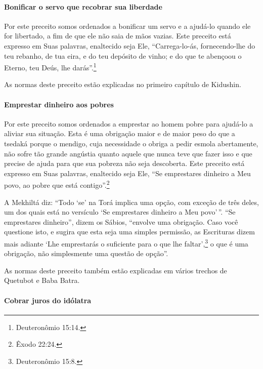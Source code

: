 \paragraph{Bonificar o servo que recobrar sua liberdade}

Por este preceito somos ordenados a bonificar um servo e a ajudá-lo
quando ele for libertado, a fim de que ele não saia de mãos vazias. Este
preceito está expresso em Suas palavras, enaltecido seja Ele,
``Carrega-lo-ás, fornecendo-lhe do teu rebanho, de tua eira, e do teu
depósito de vinho; e do que te abençoou o Eterno, teu Deús, lhe darás''.\footnote{Deuteronômio 15:14.}

As normas deste preceito estão explicadas no primeiro capítulo de Kidushin.

\paragraph{Emprestar dinheiro aos pobres}

Por este preceito somos ordenados a emprestar ao homem pobre para
ajudá-lo a aliviar sua situação. Esta é uma obrigação maior e de maior
peso do que a tsedaká porque o mendigo, cuja necessidade o obriga a
pedir esmola abertamente, não sofre tão grande angústia quanto aquele
que nunca teve que fazer isso e que precise de ajuda para que sua
pobreza não seja descoberta. Este preceito está expresso em Suas
palavras, enaltecido seja Ele, ``Se emprestares dinheiro a Meu povo, ao
pobre que está contigo''.\footnote{Êxodo 22:24.}

A Mekhiltá diz: ``Todo `se' na Torá implica uma opção, com exceção de
três deles, um dos quais está no versículo `Se emprestares dinheiro a
Meu povo'\,''. ``Se emprestares dinheiro'', dizem os Sábios, ``envolve uma
obrigação. Caso você questione isto, e sugira que esta seja uma simples
permissão, as Escrituras dizem mais adiante `Lhe emprestarás o
suficiente para o que lhe faltar',\footnote{Deuteronômio 15:8.} o que é uma
obrigação, não simplesmente uma questão de opção''.

As normas deste preceito também estão explicadas em vários trechos de
Quetubot e Baba Batra.

\paragraph{Cobrar juros do idólatra}

